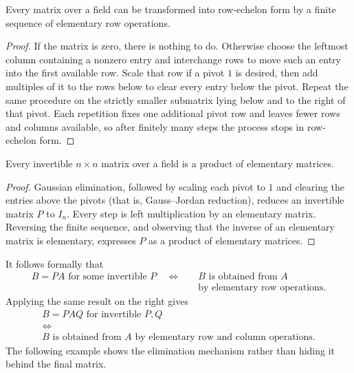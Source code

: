 \begin{theorem}
\label{thm:gaussian-elimination-existence}
Every matrix over a field can be transformed into row-echelon form by a
finite sequence of elementary row operations.
\end{theorem}
\begin{proof}
If the matrix is zero, there is nothing to do.  Otherwise choose the leftmost
column containing a nonzero entry and interchange rows to move such an entry
into the first available row.  Scale that row if a pivot \(1\) is desired,
then add multiples of it to the rows below to clear every entry below the
pivot.  Repeat the same procedure on the strictly smaller submatrix lying
below and to the right of that pivot.  Each repetition fixes one additional
pivot row and leaves fewer rows and columns available, so after finitely many
steps the process stops in row-echelon form.
\end{proof}

\begin{corollary}
\label{cor:elementary-matrices-generate-gl}
Every invertible \(n\times n\) matrix over a field is a product of elementary
matrices.
\end{corollary}
\begin{proof}
Gaussian elimination, followed by scaling each pivot to \(1\) and clearing
the entries above the pivots (that is, Gauss--Jordan reduction), reduces an
invertible matrix \(P\) to \(I_n\).  Every step is left multiplication by an
elementary matrix.  Reversing the finite sequence, and observing that the
inverse of an elementary matrix is elementary, expresses \(P\) as a product
of elementary matrices.
\end{proof}

It follows formally that
\[
\begin{aligned}
B=PA\text{ for some invertible }P
\quad\Longleftrightarrow\quad{}&
B\text{ is obtained from }A\\
&\text{by elementary row operations}.
\end{aligned}
\]
Applying the same result on the right gives
\[
\begin{gathered}
B=PAQ\text{ for invertible }P,Q\\
\Longleftrightarrow\\
B\text{ is obtained from }A\text{ by elementary row and column operations}.
\end{gathered}
\]
The following example shows the elimination mechanism rather than hiding it
behind the final matrix.

